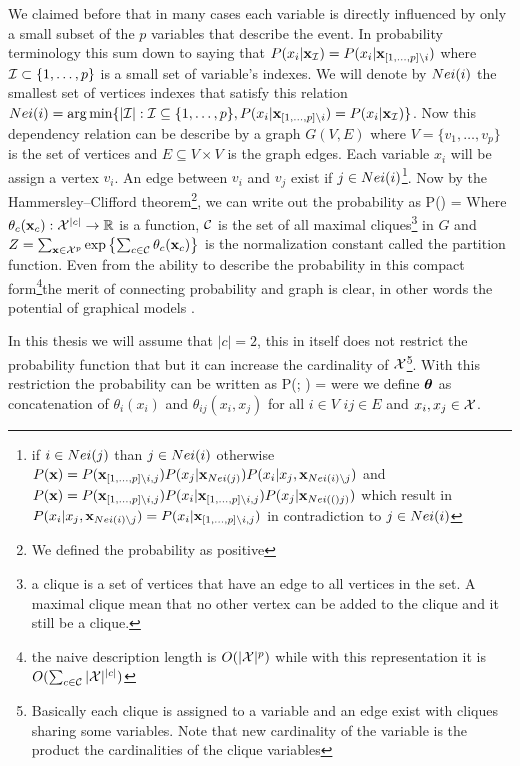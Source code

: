 We claimed before that in many cases each variable is directly influenced by only a small subset of the $p$ variables that describe the event.
In probability terminology this sum down to saying that $P(x_i |{\bf x}_{{\cal I}}) = P(x_i|{\bf x}_{[1,\ldots,p] \setminus i})$ where ${\cal I} \subset \{1,\ldots,p\}$  is a small set of variable's indexes.
We will denote by $Nei(i)$ the smallest set of vertices indexes that satisfy this relation $Nei(i) = \arg\min \{|{\cal I}| : {\cal I} \subseteq \{1,\ldots,p\}, P(x_i|{\bf x}_{[1,\ldots,p] \setminus i}) = P(x_i |{\bf x}_{{\cal I}}) \}$.
Now this dependency relation can be describe by a graph $G(V,E)$ where $V = \{v_1,\ldots, v_p\}$ is the set of vertices and  $E \subseteq V \times V$ is the graph edges.
Each variable $x_i$ will be assign a vertex $v_i$. 
An edge between $v_i$ and $v_j$ exist if  $j \in Nei(i)$\footnote{if $i \in Nei(j)$ than $j \in Nei(i)$ otherwise $P({\bf x}) = P({\bf x}_{[1,\ldots,p]\setminus i,j}) P(x_j|{\bf x}_{Nei(j)}) P(x_i|x_j,{\bf x}_{Nei(i)\setminus j})$ and $P({\bf x}) = P({\bf x}_{[1,\ldots,p]\setminus i,j}) P(x_i|{\bf x}_{[1,\ldots,p]\setminus i,j}) P(x_j|{\bf x}_{Nei(()j)})$ which result in $P(x_i|x_j,{\bf x}_{Nei(i)\setminus j}) =   P(x_i|{\bf x}_{[1,\ldots,p]\setminus i,j})$ in contradiction to $j \in Nei(i)$}.
Now by the Hammersley–Clifford theorem\cite{hammersley1971markov}\footnote{We defined the probability as positive}, we can write out the probability as
\be
P(\xx) =  
\ee
Where $\theta_{c}({\bf x}_{c}): {\cal X}^{|c|} \to \mathbb{R}$  is a function, ${\cal C}$ is the set of all maximal cliques\footnote{a clique is a set of vertices that have an edge to all vertices in the set. A maximal clique mean that no other vertex can be added to the clique and it still be a clique.} in $G$ and $Z = \sum_{{\bf x} \in {\cal X}^p} {\mathrm{exp}}\left\{\sum_{c \in {\cal C}}\theta_{c}({\bf x}_{c})\right\}$ is the normalization constant called the partition function.
Even from the ability to describe the probability in this compact form\footnote{the naive description length is $O(|{\cal X}|^p)$ while with this representation it is $O(\sum_{c \in {\cal C}} |{\cal X}|^{|c|})$}the merit of connecting probability and graph is clear, in other words the potential of graphical models \cite{koller2009probabilistic}.


In this thesis we will assume that $|c| = 2$, this in itself does not restrict the probability function that but it can increase the cardinality of ${\cal X}$\footnote{Basically each clique is assigned to a variable and an edge exist with cliques sharing some variables. Note that new cardinality of the variable is the product the cardinalities of the clique variables }.
With this restriction the probability can be written as
\be
\label{eq:basic_model}
P(\xx; \thetav) =  
\ee
were we define $\boldsymbol{\theta}$ as concatenation of $\theta_i(x_i)$ and $\theta_{ij}(x_i,x_j)$ for all $i \in V$ $ij \in E$ and $x_i,x_j \in {\cal X}$.

